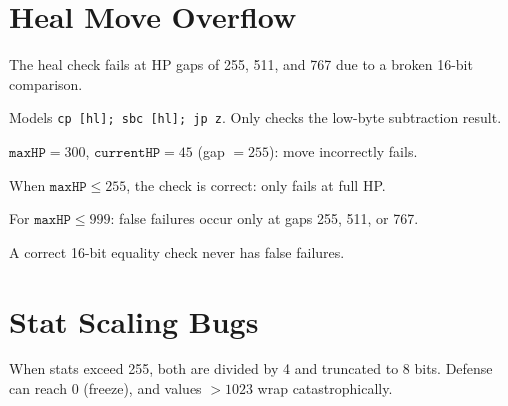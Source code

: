 \chapter{Heal Move Overflow}\label{ch:heal_overflow}

The heal check fails at HP gaps of 255, 511, and 767 due to a broken 16-bit comparison.

\begin{definition}\label{def:heal_check}
  \leanok
  Models \texttt{cp [hl]; sbc [hl]; jp z}. Only checks the low-byte subtraction result.
\end{definition}

\begin{theorem}\label{thm:heal_gap_255}
  \leanok
  $\texttt{maxHP} = 300$, $\texttt{currentHP} = 45$ (gap $= 255$): move incorrectly fails.
\end{theorem}

\begin{theorem}\label{thm:heal_no_false_fail}
  \leanok
  When $\texttt{maxHP} \le 255$, the check is correct: only fails at full HP.
\end{theorem}

\begin{theorem}\label{thm:bad_gaps_enumerated}
  \leanok
  For $\texttt{maxHP} \le 999$: false failures occur only at gaps 255, 511, or 767.
\end{theorem}

\begin{theorem}\label{thm:heal_correct}
  \leanok
  A correct 16-bit equality check never has false failures.
\end{theorem}

\chapter{Stat Scaling Bugs}\label{ch:stat_scaling}

When stats exceed 255, both are divided by 4 and truncated to 8 bits.
Defense can reach 0 (freeze), and values $> 1023$ wrap catastrophically.


